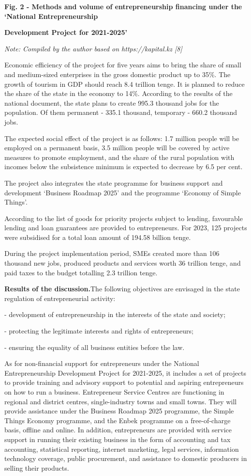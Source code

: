 {\bfseries Fig. 2 - Methods and volume of entrepreneurship financing under
the `National Entrepreneurship}

{\bfseries Development Project for 2021-2025'}

\emph{Note: Compiled by the author based on https://kapital.kz {[}8{]}}

Economic efficiency of the project for five years aims to bring the
share of small and medium-sized enterprises in the gross domestic
product up to 35\%. The growth of tourism in GDP should reach 8.4
trillion tenge. It is planned to reduce the share of the state in the
economy to 14\%. According to the results of the national document, the
state plans to create 995.3 thousand jobs for the population. Of them
permanent - 335.1 thousand, temporary - 660.2 thousand jobs.

The expected social effect of the project is as follows: 1.7 million
people will be employed on a permanent basis, 3.5 million people will be
covered by active measures to promote employment, and the share of the
rural population with incomes below the subsistence minimum is expected
to decrease by 6.5 per cent.

The project also integrates the state programme for business support and
development `Business Roadmap 2025' and the programme `Economy of Simple
Things'.

According to the list of goods for priority projects subject to lending,
favourable lending and loan guarantees are provided to entrepreneurs.
For 2023, 125 projects were subsidised for a total loan amount of 194.58
billion tenge.

During the project implementation period, SMEs created more than 106
thousand new jobs, produced products and services worth 36 trillion
tenge, and paid taxes to the budget totalling 2.3 trillion tenge.

{\bfseries Results of the discussion.}The following objectives are
envisaged in the state regulation of entrepreneurial activity:

- development of entrepreneurship in the interests of the state and
society;

- protecting the legitimate interests and rights of entrepreneurs;

- ensuring the equality of all business entities before the law.

As for non-financial support for entrepreneurs under the National
Entrepreneurship Development Project for 2021-2025, it includes a set of
projects to provide training and advisory support to potential and
aspiring entrepreneurs on how to run a business. Entrepreneur Service
Centres are functioning in regional and district centres,
single-industry towns and small towns. They will provide assistance
under the Business Roadmap 2025 programme, the Simple Things Economy
programme, and the Enbek programme on a free-of-charge basis, offline
and online. In addition, entrepreneurs are provided with service support
in running their existing business in the form of accounting and tax
accounting, statistical reporting, internet marketing, legal services,
information technology coverage, public procurement, and assistance to
domestic producers in selling their products.

